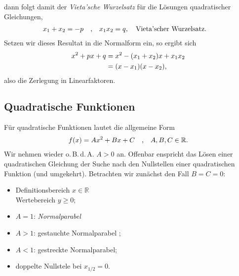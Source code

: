 dann folgt damit der \emph{Vieta'sche Wurzelsatz} für die Lösungen quadratischer Gleichungen, 
\begin{align}
    x_1 + x_2 = -p \qq{,} x_1 x_2 = q, \qq{Vieta'scher Wurzelsatz.}
\end{align}
Setzen wir dieses Resultat in die Normalform ein, so ergibt sich 
\begin{align}
        x^2 + px + q &= x^2 - (x_1 + x_2) x + x_1 x_2 \notag \\
        &= (x-x_1) (x-x_2), 
\end{align}
also die Zerlegung in Linearfaktoren.

\subsection{Quadratische Funktionen}

Für quadratische Funktionen lautet die allgemeine Form 
\begin{align}
    f(x) = Ax^2 + Bx + C \qq{,} A,B,C \in \mathbb{R}.
\end{align}
Wir nehmen wieder o.\,B.\,d.\,A. $A > 0$ an. Offenbar enspricht das Lösen einer quadratischen Gleichung der Suche nach den Nullstellen einer quadratischen Funktion (und umgekehrt). Betrachten wir zunächst den Fall $B = C = 0$: 

\begin{minipage}{0.45\textwidth}
    \begin{itemize}
        \item Definitionsbereich $x \in \mathbb{R}$ \\
        Wertebereich $y \ge 0$;
        \item $A = 1$: \emph{Normalparabel} 
        \item $A > 1$: gestauchte Normalparabel ;
        \item $A < 1$: gestreckte Normalparabel;
        \item doppelte Nullstele bei $x_{1/2} = 0.$
    \end{itemize}
\end{minipage}
\begin{minipage}{0.55\textwidth}
        \centering
\end{minipage}

